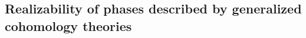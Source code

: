 \documentclass[sort&compress]{elsarticle}
\theoremstyle{theoremstyle}
\theoremstyle{framedtheoremstyle}
\theoremstyle{definitionstyle}
\theoremstyle{definitionstyle}
\theoremstyle{definitionstyle}
\theoremstyle{definitionstyle}
\theoremstyle{nameddefinitionstyle}
\theoremstyle{framednameddefinitionstyle}
\theoremstyle{proofstyle}
\theoremstyle{definitionstyle}
\newcommand{\fromto}{\rightarrow}
\newcommand{\ket}[1]{\left|#1\right\rangle}
\begin{document}
%














%








\subsection{Realizability of phases described by generalized cohomology theories\label{subsec:realizability}}
\end{document}
